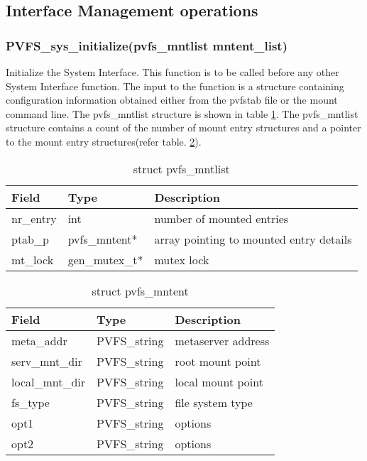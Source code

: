 \documentclass[11pt, letterpaper]{article}
\begin{document}
\subsection{Interface Management operations}

\subsubsection{PVFS\_sys\_initialize(pvfs\_mntlist mntent\_list)}

Initialize the System Interface. This function is to be called before
any other System Interface function. The input to the function is a
structure containing configuration information obtained either from the
pvfstab file or the mount command line. The pvfs\_mntlist structure is
shown in table \ref{tab:reqinit}. The pvfs\_mntlist structure contains
a count of the number of mount entry structures and a pointer to the mount
entry structures(refer table. \ref{tab:mntent}).

\begin{table}[H]
\begin{tabular}{|l|l|l|}
\hline 
Field & Type & Description \\
\hline
\hline
nr\_entry & int & number of mounted entries \\
\hline
ptab\_p & pvfs\_mntent* & array pointing to mounted entry details \\
\hline
mt\_lock & gen\_mutex\_t* & mutex lock \\
\hline
\end{tabular}
\caption{struct pvfs\_mntlist}\label{tab:reqinit}
\end{table}

\begin{table}[H]
\begin{tabular}{|l|l|l|}
\hline
Field & Type & Description \\
\hline
\hline
meta\_addr & PVFS\_string & metaserver address \\
\hline
serv\_mnt\_dir & PVFS\_string & root mount point \\
\hline
local\_mnt\_dir & PVFS\_string & local mount point \\
\hline
fs\_type & PVFS\_string & file system type \\
\hline
opt1 & PVFS\_string & options \\
\hline
opt2 & PVFS\_string & options \\
\hline
\end{tabular}
\caption{struct pvfs\_mntent}\label{tab:mntent}
\end{table}
\end{document}
